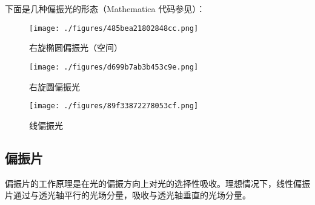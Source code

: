 下面是几种偏振光的形态（Mathematica 代码参见）：

\begin{figure}[ht]
\centering
\texttt{[image: ./figures/485bea21802848cc.png]}
\caption{右旋椭圆偏振光（空间）} \label{fig_PolLig_6}
\end{figure}

\begin{figure}[ht]
\centering
\texttt{[image: ./figures/d699b7ab3b453c9e.png]}
\caption{右旋圆偏振光} \label{fig_PolLig_7}
\end{figure}

\begin{figure}[ht]
\centering
\texttt{[image: ./figures/89f33872278053cf.png]}
\caption{线偏振光} \label{fig_PolLig_10}
\end{figure}






\subsection{偏振片}
偏振片的工作原理是在光的偏振方向上对光的选择性吸收。理想情况下，线性偏振片通过与透光轴平行的光场分量，吸收与透光轴垂直的光场分量。

